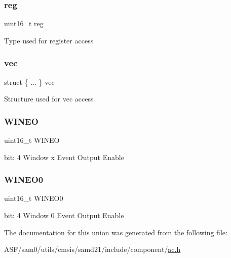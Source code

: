 \subsubsection{\texorpdfstring{reg}{reg}}
{\footnotesize\ttfamily uint16\+\_\+t reg}

Type used for register access \mbox{\label{union_a_c___e_v_c_t_r_l___type_a76faa8995cb9073e470a55f5a50a4d25}} 
\subsubsection{\texorpdfstring{vec}{vec}}
{\footnotesize\ttfamily struct \{ ... \}   vec}

Structure used for vec access \mbox{\label{union_a_c___e_v_c_t_r_l___type_ab7360af94bcc95c927b21d5542264ecc}} 
\subsubsection{\texorpdfstring{WINEO}{WINEO}}
{\footnotesize\ttfamily uint16\+\_\+t W\+I\+N\+EO}

bit\+: 4 Window x Event Output Enable \mbox{\label{union_a_c___e_v_c_t_r_l___type_a04bb6b9055a0b55cf8e4d2c6aac67303}} 
\subsubsection{\texorpdfstring{WINEO0}{WINEO0}}
{\footnotesize\ttfamily uint16\+\_\+t W\+I\+N\+E\+O0}

bit\+: 4 Window 0 Event Output Enable 

The documentation for this union was generated from the following file\+:\begin{DoxyCompactItemize}
\item 
A\+S\+F/sam0/utils/cmsis/samd21/include/component/\mbox{\hyperlink{component_2ac_8h}{ac.\+h}}\end{DoxyCompactItemize}
